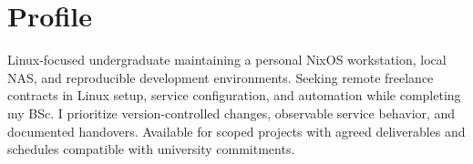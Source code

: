 \documentclass[11pt,a4paper]{article}
\begin{document}


\section{Profile}
Linux-focused undergraduate maintaining a personal NixOS workstation, local NAS, and reproducible
development environments. Seeking remote freelance contracts in Linux setup, service configuration,
and automation while completing my BSc. I prioritize version-controlled changes, observable service
behavior, and documented handovers. Available for scoped projects with agreed deliverables and
schedules compatible with university commitments.






\end{document}
